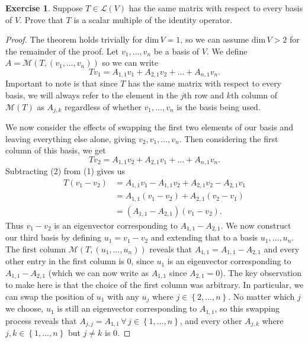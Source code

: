 \documentclass{article}
\theoremstyle{definition}
\newtheorem{ex}{Exercise}
\begin{document}
\begin{ex}
	Suppose $T \in \mathcal{L}(V)$ has the same matrix with respect to every basis of $V$.
	Prove that $T$ is a scalar multiple of the identity operator.
\end{ex}
\begin{proof}
	The theorem holds trivially for $\mathrm{dim}\,V = 1$, so we can assume $\mathrm{dim}\,V > 2$ for the remainder of the proof.
	Let $v_1, \dots, v_n$ be a basis of $V$.
	We define $A =\mathcal{M}(T, (v_1, \dots, v_n))$ so we can write \begin{equation*}
		Tv_1 = A_{1, 1}v_1 + A_{2, 1}v_2 + \dots + A_{n, 1}v_n. \tag{1}
	\end{equation*}
	Important to note is that since $T$ has the same matrix with respect to every basis, we will always refer to the element in the $j$th row and $k$th column of $\mathcal{M}(T)$ as $A_{j, k}$ regardless of whether $v_1, \dots, v_n$ is the basis being used.

	We now consider the effects of swapping the first two elements of our basis and leaving everything else alone, giving $v_2, v_1, \dots, v_n$.
	Then considering the first column of this basis, we get \begin{equation*}
		Tv_2 = A_{1, 1}v_2 + A_{2, 1}v_1 + \dots + A_{n, 1}v_n. \tag{2}
	\end{equation*}
	Subtracting (2) from (1) gives us \begin{align*}
		T(v_1 - v_2) & = A_{1, 1}v_1 - A_{1, 1}v_2 + A_{2, 1}v_2 - A_{2, 1}v_1 \\
		             & = A_{1, 1}(v_1 - v_2) + A_{2, 1}(v_2 - v_1)             \\
		             & = (A_{1, 1} - A_{2, 1})(v_1 - v_2).
	\end{align*}
	Thus $v_1 - v_2$ is an eigenvector corresponding to $A_{1, 1} - A_{2, 1}$.
	We now construct our third basis by defining $u_1 = v_1 - v_2$ and extending that to a basis $u_1, \dots, u_n$.
	The first column $\mathcal{M}(T, (u_1, \dots, u_n))$ reveals that $A_{1, 1} = A_{1, 1} - A_{2, 1}$ and every other entry in the first column is 0, since $u_1$ is an eigenvector corresponding to $A_{1, 1} - A_{2, 1}$ (which we can now write as $A_{1, 1}$ since $A_{2, 1} = 0$).
	The key observation to make here is that the choice of the first column was arbitrary.
	In particular, we can swap the position of $u_1$ with any $u_j$ where $j \in \left\lbrace 2, \dots, n  \right\rbrace$.
	No matter which $j$ we choose, $u_1$ is still an eigenvector corresponding to $A_{1, 1}$, so this swapping process reveals that $A_{j, j} = A_{1, 1} \,\forall\, j \in \left\lbrace 1, \dots, n  \right\rbrace$, and every other $A_{j, k}$ where $j, k \in \left\lbrace 1, \dots, n  \right\rbrace$ but $j \neq k$ is 0.


\end{proof}
\end{document}
